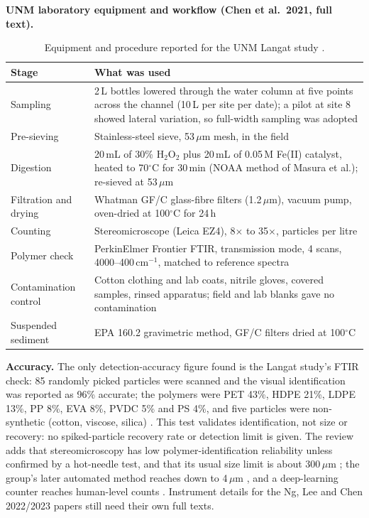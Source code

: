 \documentclass[11pt,a4paper]{article}
\newcommand{\um}{\,\ensuremath{\mu}m}
\begin{document}
\noindent\textbf{UNM laboratory equipment and workflow (Chen et al.\ 2021, full text).}
\begin{table}[H]\centering\small
\begin{tabularx}{\textwidth}{@{}p{3.2cm}X@{}}
\toprule Stage & What was used \\\midrule
Sampling & 2\,L bottles lowered through the water column at five points across the channel (10\,L per site per date); a pilot at site 8 showed lateral variation, so full-width sampling was adopted \\
Pre-sieving & Stainless-steel sieve, 53\um{} mesh, in the field \\
Digestion & 20\,mL of 30\% H$_2$O$_2$ plus 20\,mL of 0.05\,M Fe(II) catalyst, heated to 70$^\circ$C for 30\,min (NOAA method of Masura et al.); re-sieved at 53\um \\
Filtration and drying & Whatman GF/C glass-fibre filters (1.2\um), vacuum pump, oven-dried at 100$^\circ$C for 24\,h \\
Counting & Stereomicroscope (Leica EZ4), 8$\times$ to 35$\times$, particles per litre \\
Polymer check & PerkinElmer Frontier FTIR, transmission mode, 4 scans, 4000--400\,cm$^{-1}$, matched to reference spectra \\
Contamination control & Cotton clothing and lab coats, nitrile gloves, covered samples, rinsed apparatus; field and lab blanks gave no contamination \\
Suspended sediment & EPA 160.2 gravimetric method, GF/C filters dried at 100$^\circ$C \\
\bottomrule\end{tabularx}
\caption{Equipment and procedure reported for the UNM Langat study \cite{chen21a}.}
\end{table}
\noindent\textbf{Accuracy.} The only detection-accuracy figure found is the Langat study's FTIR check: 85 randomly picked particles were scanned and the visual identification was reported as 96\% accurate; the polymers were PET 43\%, HDPE 21\%, LDPE 13\%, PP 8\%, EVA 8\%, PVDC 5\% and PS 4\%, and five particles were non-synthetic (cotton, viscose, silica) \cite{chen21a}. This test validates identification, not size or recovery: no spiked-particle recovery rate or detection limit is given. The review adds that stereomicroscopy has low polymer-identification reliability unless confirmed by a hot-needle test, and that its usual size limit is about 300\um{} \cite{bouida26}; the group's later automated method reaches down to 4\um{} \cite{ng24}, and a deep-learning counter reaches human-level counts \cite{lee22}. Instrument details for the Ng, Lee and Chen 2022/2023 papers still need their own full texts.
\end{document}

